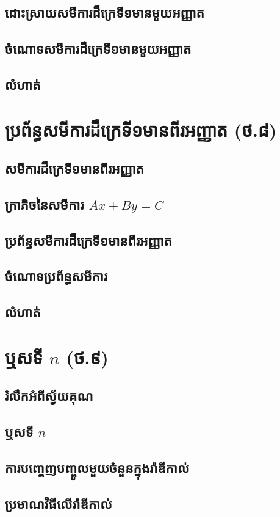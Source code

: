 \documentclass[a4paper,12pt,blue]{pptec}
\begin{document}
	\section{ដោះស្រាយសមីការដឺក្រេទី១មានមួយអញ្ញាត}
	\section{ចំណោទសមីការដឺក្រេទី១មានមួយអញ្ញាត}
	\section{លំហាត់}
	\chapter{ប្រព័ន្ធសមីការដឺក្រេទី១មានពីរអញ្ញាត (ថ.៨)}
	\section{សមីការដឺក្រេទី១មានពីរអញ្ញាត}
	\section{ក្រាភិចនៃសមីការ $ Ax+By=C $}
	\section{ប្រព័ន្ធសមីការដឺក្រេទី១មានពីរអញ្ញាត}
	\section{ចំណោទប្រព័ន្ធសមីការ}
	\section{លំហាត់}
	\chapter{ឬសទី $ n $ (ថ.៩)}
	\section{រំលឹកអំពីស្វ័យគុណ}
	\section{ឬសទី $ n $}
	\section{ការបញ្ចេញបញ្ចូលមួយចំនួនក្នុងរ៉ាឌីកាល់}
	\section{ប្រមាណវិធីលើរ៉ាឌីកាល់}
\end{document}
